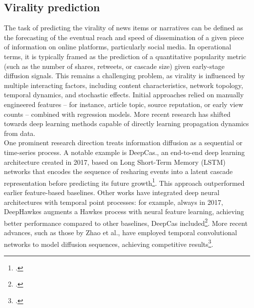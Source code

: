 \documentclass[a4paper,twoside,12pt]{book}
\begin{document}
	\subsection*{Virality prediction}
	The task of predicting the virality of news items or narratives can be defined as the forecasting of the eventual reach and speed of dissemination of a given piece of information on online platforms, particularly social media. In operational terms, it is typically framed as the prediction of a quantitative popularity metric (such as the number of shares, retweets, or cascade size) given early-stage diffusion signals. This remains a challenging problem, as virality is influenced by multiple interacting factors, including content characteristics, network topology, temporal dynamics, and stochastic effects. Initial approaches relied on manually engineered features -- for instance, article topic, source reputation, or early view counts -- combined with regression models. More recent research has shifted towards deep learning methods capable of directly learning propagation dynamics from data. \\
	
	One prominent research direction treats information diffusion as a sequential or time-series process. A notable example is DeepCas., an end-to-end deep learning architecture created in 2017, based on Long Short-Term Memory (LSTM) networks that encodes the sequence of resharing events into a latent cascade representation before predicting its future growth\footcite{li2017}. This approach outperformed earlier feature-based baselines. Other works have integrated deep neural architectures with temporal point processes: for example, always in 2017, DeepHawkes augments a Hawkes process with neural feature learning, achieving better performance compared to other baselines, DeepCas included\footcite{cao2017}. More recent advances, such as those by Zhao et al., have employed temporal convolutional networks to model diffusion sequences, achieving competitive results\footcite{zhao2022}. \\
	
\end{document}
